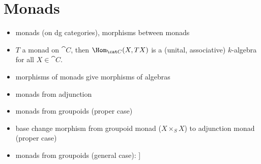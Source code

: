 \section{Monads}
\label{sec:d-mod:pre:monads}

\begin{itemize}
    \item monads (on dg categories), morphisms between monads
    \item $T$ a monad on $\cat C$, then $\Hom_{\cat C}(X, TX)$ is a (unital, associative) $k$-algebra for all $X ∈ \cat C$.
    \item morphisms of monads give morphisms of algebras
    \item monads from adjunction
    \item monads from groupoids (proper case)
    \item base change morphism from groupoid monad ($X ×_S X$) to adjunction monad (proper case)
    \item monads from groupoids (general case): \cite[Lemma~II.1.7.1.4]{GaitsgoryRozenblyum:prelim:StudyInDAG}]
\end{itemize}

